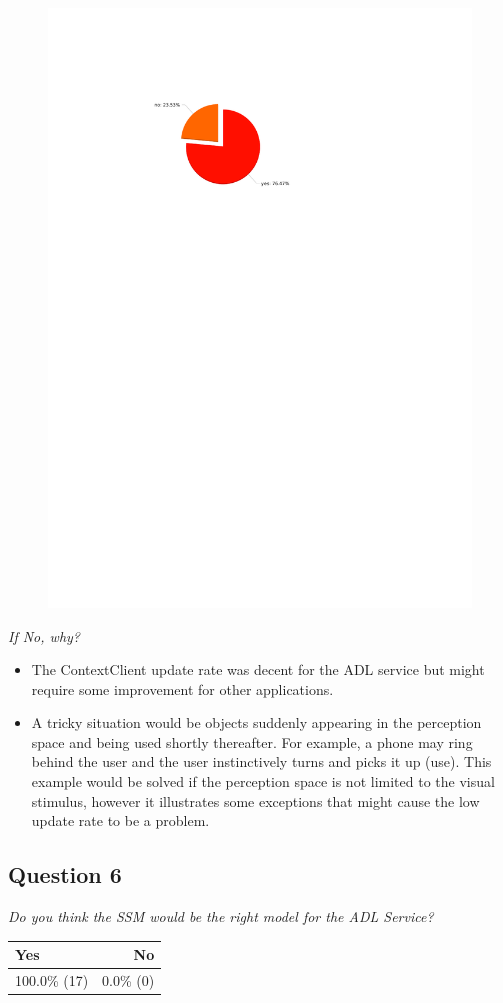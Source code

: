 \begin{figure}[H]
	\centering
	\includegraphics[width=0.6\linewidth]{gfx/Chapter_EvaluationResults/ALFTask/question5}
\end{figure}

\emph{If No, why?}
\begin{itemize}
	\item The ContextClient update rate was decent for the ADL service but might require some improvement for other applications.
	\item A tricky situation would be objects suddenly appearing in the perception space and being used shortly thereafter. For example, a phone may ring behind the user and the user instinctively turns and picks it up (use). This example would be solved if the perception space is not limited to the visual stimulus, however it illustrates some exceptions that might cause the low update rate to be a problem.
\end{itemize}

\subsection{Question 6}\label{question1:6}
\emph{Do you think the SSM would be the right model for the ADL Service?}
\begin{table}[H]
	\begin{center}
		\small \begin{tabular*}{0.35\columnwidth}{lr}
			\\ \hline \hline
			Yes & No \\ \hline \hline

		 	100.0\% (17) & 0.0\% (0)\\ \hline
		\end{tabular*}
	\end{center}
\end{table}

